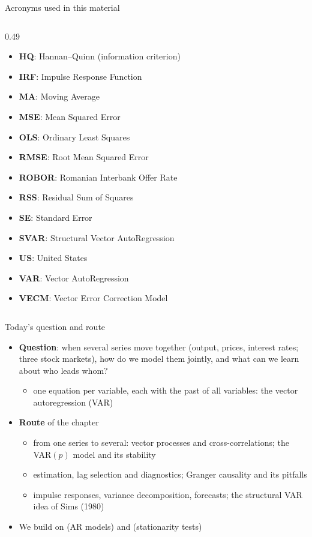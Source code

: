 \begin{frame}{Acronyms used in this material}
\begin{columns}[T]
\begin{column}{0.49\textwidth}
\begin{itemize}
    \item \textbf{HQ}: Hannan–Quinn (information criterion)
    \item \textbf{IRF}: Impulse Response Function
    \item \textbf{MA}: Moving Average
    \item \textbf{MSE}: Mean Squared Error
    \item \textbf{OLS}: Ordinary Least Squares
    \item \textbf{RMSE}: Root Mean Squared Error
    \item \textbf{ROBOR}: Romanian Interbank Offer Rate
    \item \textbf{RSS}: Residual Sum of Squares
    \item \textbf{SE}: Standard Error
    \item \textbf{SVAR}: Structural Vector AutoRegression
    \item \textbf{US}: United States
    \item \textbf{VAR}: Vector AutoRegression
    \item \textbf{VECM}: Vector Error Correction Model
\end{itemize}
\end{column}
\end{columns}
\end{frame}

\begin{frame}{Today's question and route}
\itemsize{\small}
\begin{itemize}
    \item \textbf{Question}: when several series move together (output, prices, interest rates; three stock markets), how do we model them jointly, and what can we learn about who leads whom?
    \begin{itemize}
        \item one equation per variable, each with the past of all variables: the vector autoregression (VAR)
    \end{itemize}
    \item \textbf{Route} of the chapter
    \begin{itemize}
        \item from one series to several: vector processes and cross-correlations; the VAR$(p)$ model and its stability
        \item estimation, lag selection and diagnostics; Granger causality and its pitfalls
        \item impulse responses, variance decomposition, forecasts; the structural VAR idea of Sims (1980)
    \end{itemize}
    \item We build on  (AR models) and  (stationarity tests)
\end{itemize}
\end{frame}

